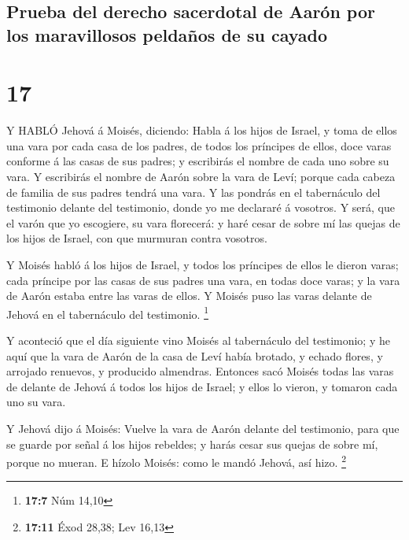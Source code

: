 \hypertarget{prueba-del-derecho-sacerdotal-de-aaruxf3n-por-los-maravillosos-peldauxf1os-de-su-cayado}{%
\subsection{Prueba del derecho sacerdotal de Aarón por los maravillosos
peldaños de su
cayado}\label{prueba-del-derecho-sacerdotal-de-aaruxf3n-por-los-maravillosos-peldauxf1os-de-su-cayado}}

\hypertarget{section-16}{%
\section{17}\label{section-16}}

 Y HABLÓ Jehová á Moisés, diciendo:  Habla á los
hijos de Israel, y toma de ellos una vara por cada casa de los padres,
de todos los príncipes de ellos, doce varas conforme á las casas de sus
padres; y escribirás el nombre de cada uno sobre su vara.  Y
escribirás el nombre de Aarón sobre la vara de Leví; porque cada cabeza
de familia de sus padres tendrá una vara.  Y las pondrás en
el tabernáculo del testimonio delante del testimonio, donde yo me
declararé á vosotros.  Y será, que el varón que yo
escogiere, su vara florecerá: y haré cesar de sobre mí las quejas de los
hijos de Israel, con que murmuran contra vosotros.

 Y Moisés habló á los hijos de Israel, y todos los príncipes
de ellos le dieron varas; cada príncipe por las casas de sus padres una
vara, en todas doce varas; y la vara de Aarón estaba entre las varas de
ellos.  Y Moisés puso las varas delante de Jehová en el
tabernáculo del testimonio. \footnote{\textbf{17:7} Núm 14,10}

 Y aconteció que el día siguiente vino Moisés al tabernáculo
del testimonio; y he aquí que la vara de Aarón de la casa de Leví había
brotado, y echado flores, y arrojado renuevos, y producido almendras.
 Entonces sacó Moisés todas las varas de delante de Jehová á
todos los hijos de Israel; y ellos lo vieron, y tomaron cada uno su
vara.

 Y Jehová dijo á Moisés: Vuelve la vara de Aarón delante
del testimonio, para que se guarde por señal á los hijos rebeldes; y
harás cesar sus quejas de sobre mí, porque no mueran.  E
hízolo Moisés: como le mandó Jehová, así hizo. \footnote{\textbf{17:11}
  Éxod 28,38; Lev 16,13}

